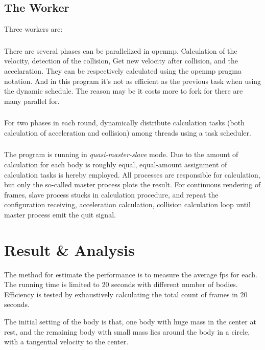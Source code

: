 \documentclass{article}
\begin{document}
		\subsection{The Worker}
			Three workers are:
			\subsubsection{\openmp}
				There are several phases can be parallelized in openmp.
				Calculation of the velocity, detection of the collision,
				Get new velocity after collision, and the accelaration.
				They can be respectively calculated using the openmp pragma notation.
				And in this program it's not as efficient as the previous task
				when using the dynamic schedule. The reason may be it costs
				more to fork for there are many parallel for.
			\subsubsection{\pthread}
				For two phases in each round, dynamically distribute
				calculation tasks (both calculation of acceleration and
				collision) among threads using a task scheduler.
			\subsubsection{\mpi}
				The program is running in {\it quasi-master-slave} mode.
				Due to the amount of calculation for each body is roughly equal,
				equal-amount assignment of calculation tasks is hereby employed.
				All processes are responsible for calculation, but only the
				so-called master process plots the result. For continuous rendering
				of frames, slave process stucks in calculation procedure,
				and repeat the configuration receiving, acceleration
				calculation, collision calculation loop until master process
				emit the quit signal.


\section{Result \& Analysis}

	The method for estimate the performance is to measure the average fps
	for each. The running time is limited to 20 seconds with different number
	of bodies. Efficiency is tested by exhaustively calculating the total count
	of frames in 20 seconds.

	The initial setting of the body is that, one body with huge mass in the
	center at rest, and the remaining body with small mass lies around the body
	in a circle, with a tangential velocity to the center.
\end{document}
